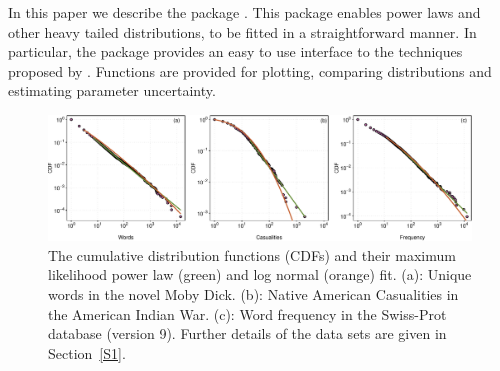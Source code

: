 \documentclass[article]{jss}
\begin{document}
In this paper we describe the  \citep{RCoreTeam2013} package
 \citep{poweRlaw}. This package enables power laws and other heavy
tailed distributions, to be fitted in a straightforward manner. In particular,
the package provides an easy to use interface to the techniques proposed by
\cite{Clauset2009}. Functions are provided for plotting, comparing distributions
and estimating parameter uncertainty.

\begin{figure}[t] 
  \centering
  \includegraphics[width=\textwidth, trim = 0 0 0 0, clip]{figure1.pdf}
   \vspace*{-0.5cm}
 \caption{The cumulative distribution functions (CDFs) and their maximum
    likelihood power law (green) and log normal (orange) fit.  (a):
    Unique words in the novel Moby Dick. (b): Native American
    Casualities in the American Indian War. (c): Word frequency in the
    Swiss-Prot database (version 9). Further details of the data sets
    are given in Section~\ref{S1}.\label{F1}}
\end{figure}
\end{document}
